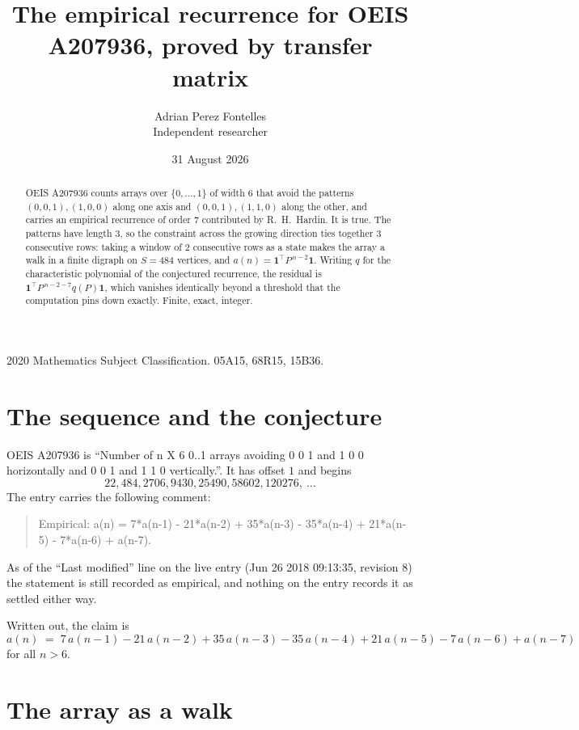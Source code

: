 \documentclass[11pt,a4paper]{article}
\title{The empirical recurrence for OEIS A207936, proved by transfer matrix}
\author{Adrian Perez Fontelles\\ \small Independent researcher}
\date{31 August 2026}
\theoremstyle{plain}
\theoremstyle{definition}
\begin{document}
\maketitle

\begin{abstract}
OEIS A207936 counts arrays over $\{0,\dots,1\}$ of width $6$ that avoid the patterns
$(0,0,1), (1,0,0)$ along one axis and $(0,0,1), (1,1,0)$ along the other, and carries an empirical recurrence of
order $7$ contributed by R.~H.~Hardin. It is true. The patterns have length $3$, so
the constraint across the growing direction ties together $3$ consecutive rows: taking a
window of $2$ consecutive rows as a state makes the array a walk in a finite digraph
on $S=484$ vertices, and $a(n)=\mathbf{1}^{\!\top}P^{\,n-2}\mathbf{1}$. Writing $q$
for the characteristic polynomial of the conjectured recurrence, the residual is
$\mathbf{1}^{\!\top}P^{\,n-2-7}q(P)\mathbf{1}$, which vanishes identically
beyond a threshold that the computation pins down exactly. Finite, exact, integer.
\end{abstract}

\noindent\small 2020 Mathematics Subject Classification. 05A15, 68R15, 15B36.\normalsize

\section{The sequence and the conjecture}

OEIS A207936 is ``Number of n X 6 0..1 arrays avoiding 0 0 1 and 1 0 0 horizontally and 0 0 1 and 1 1 0 vertically.''. It has offset
$1$ and begins
\[
22, 484, 2706, 9430, 25490, 58602, 120276,\ \dots
\]
The entry carries the following comment:
\begin{quote}\small
Empirical: a(n) = 7*a(n-1) - 21*a(n-2) + 35*a(n-3) - 35*a(n-4) + 21*a(n-5) - 7*a(n-6) + a(n-7).
\end{quote}
As of the ``Last modified'' line on the live entry (Jun 26 2018 09:13:35, revision
8) the statement is still recorded as empirical, and nothing on the entry
records it as settled either way.

Written out, the claim is
\begin{equation}\label{eq:conj}
a(n)\;=\;7\,a(n-1) - 21\,a(n-2) + 35\,a(n-3) - 35\,a(n-4) + 21\,a(n-5) - 7\,a(n-6) + a(n-7)
\end{equation}
for all $n>6$. 

\section{The array as a walk}
\end{document}
